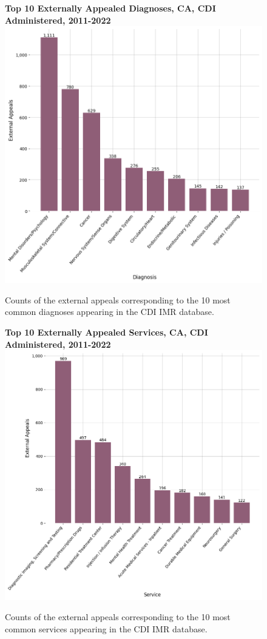 \documentclass[12pt, a4paper,twoside]{report}
\theoremstyle{plain} %
\theoremstyle{definition} %
\theoremstyle{remark} %
\numberwithin{equation}{chapter}
\begin{document}
		\begin{figure}[h!]
			\centering
			\textbf{Top 10 Externally Appealed Diagnoses, CA, CDI Administered, 2011-2022}
			\includegraphics[width=.8\textwidth]{images/ca_doi_external_appeals/top_externally_appealed_diagnoses.png}
			\caption{Counts of the external appeals corresponding to the 10 most common diagnoses appearing in the CDI IMR database.}
			\label{cacdiexternalappealsbydiagnosis}
		\end{figure}
	
	
		\begin{figure}[h!]
			\centering
			\textbf{Top 10 Externally Appealed Services, CA, CDI Administered, 2011-2022}
			\includegraphics[width=.8\textwidth]{images/ca_doi_external_appeals/top_externally_appealed_treatments.png}
			\caption{Counts of the external appeals corresponding to the 10 most common services appearing in the CDI IMR database.}
			\label{cacdiexternalappealsbyservice}
		\end{figure}
	
\end{document}
